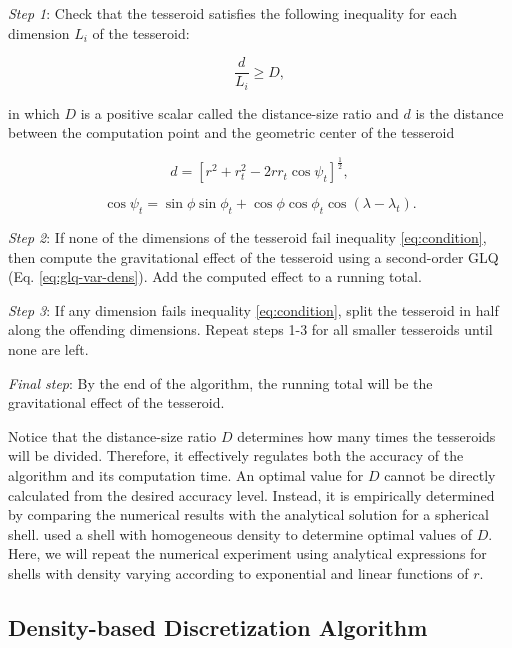 \documentclass[extra]{gji}
\begin{document}
\textit{Step 1}: Check that the tesseroid satisfies the following inequality for each
dimension $L_i$ of the tesseroid:

\begin{equation}
    \frac{d}{L_i} \geq D,
    \label{eq:condition}
\end{equation}

\noindent
in which $D$ is a positive scalar called the distance-size ratio and $d$ is the distance
between the computation point and the geometric center of the tesseroid

\begin{equation}
    d = \left[
        r^2 + r_t^2 - 2 r r_t \cos\psi_t
        \right]^{\frac{1}{2}} ,
    \label{eq:distance}
\end{equation}

\begin{equation}
    \cos\psi_t =
        \sin\phi\sin\phi_t + \cos\phi\cos\phi_t\cos(\lambda - \lambda_t) .
\end{equation}

\textit{Step 2}:
If none of the dimensions of the tesseroid fail inequality
\ref{eq:condition}, then compute the gravitational effect of the tesseroid using a
second-order GLQ (Eq. \ref{eq:glq-var-dens}).
Add the computed effect to a running total.

\textit{Step 3}:
If any dimension fails inequality \ref{eq:condition}, split the tesseroid in half along
the offending dimensions.
Repeat steps 1-3 for all smaller tesseroids until none are left.

\textit{Final step}:
By the end of the algorithm, the running total will be the gravitational effect of the
tesseroid.

Notice that the distance-size ratio $D$ determines how many
times the tesseroids will be divided.
Therefore, it effectively regulates both the accuracy of the algorithm and its
computation time.
An optimal value for $D$ cannot be directly calculated from the desired accuracy level.
Instead, it is empirically determined by comparing the numerical results with the
analytical solution for a spherical shell.
\citet{Uieda2016} used a shell with homogeneous density to determine optimal values of
$D$.
Here, we will repeat the numerical experiment using analytical expressions for shells
with density varying according to exponential and linear functions of $r$.


\subsection{Density-based Discretization Algorithm}
\end{document}
